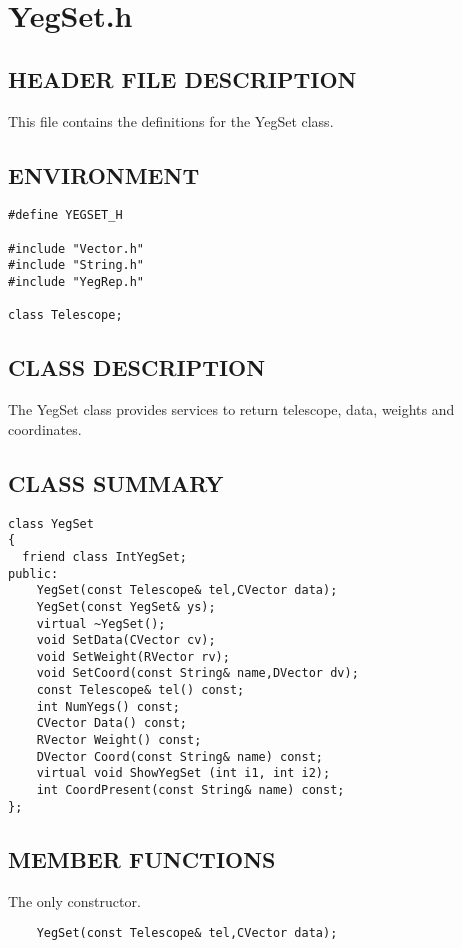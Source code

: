 \clearpage
\section{YegSet.h}

\subsection*{HEADER FILE DESCRIPTION}
  This file contains the definitions for the YegSet class.
 
\subsection*{ENVIRONMENT}
\begin{verbatim}
#define YEGSET_H

#include "Vector.h"
#include "String.h"
#include "YegRep.h"

class Telescope;
\end{verbatim}

\subsection*{CLASS DESCRIPTION}
 The YegSet class provides services to return telescope, data, weights
 and coordinates.

\subsection*{CLASS SUMMARY}
\begin{verbatim}
class YegSet
{
  friend class IntYegSet;
public:
    YegSet(const Telescope& tel,CVector data);
    YegSet(const YegSet& ys);
    virtual ~YegSet();
    void SetData(CVector cv);
    void SetWeight(RVector rv);
    void SetCoord(const String& name,DVector dv);
    const Telescope& tel() const;
    int NumYegs() const;
    CVector Data() const;
    RVector Weight() const;
    DVector Coord(const String& name) const;
    virtual void ShowYegSet (int i1, int i2);
    int CoordPresent(const String& name) const;
};
\end{verbatim}

\subsection*{MEMBER FUNCTIONS}
  
    The only constructor.
\begin{verbatim}
    YegSet(const Telescope& tel,CVector data);
\end{verbatim}
  
